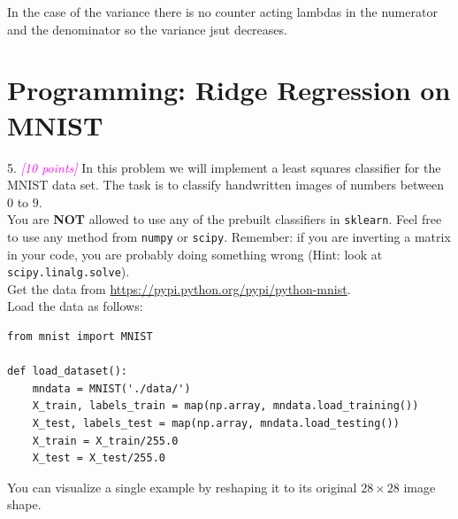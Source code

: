 \documentclass{article}
\newcommand{\1}{\mathbf{1}}
\newcommand{\grade}[1]{\small\textcolor{magenta}{\emph{[#1 points]}} \normalsize}
\begin{document}
In the case of the variance there is no counter acting lambdas in the numerator and the denominator so the variance jsut decreases. 


\section{Programming: Ridge Regression on MNIST}
5. \grade{10} In this problem we will implement a least squares classifier for the MNIST data set. The task
is to classify handwritten images of numbers between $0$ to $9$.\\

You are \textbf{NOT} allowed to use
any of the prebuilt  classifiers in \verb|sklearn|.  Feel free to use any method from \verb|numpy|
or \verb|scipy|. Remember: if you are inverting a matrix in your code, you are probably doing something wrong (Hint: look at \verb|scipy.linalg.solve|).\\

Get the data from \url{https://pypi.python.org/pypi/python-mnist}. \\
Load the data as follows:
\begin{verbatim}
from mnist import MNIST

def load_dataset():
    mndata = MNIST('./data/')
    X_train, labels_train = map(np.array, mndata.load_training())
    X_test, labels_test = map(np.array, mndata.load_testing())
    X_train = X_train/255.0
    X_test = X_test/255.0
\end{verbatim}
You can visualize a single example by reshaping it to its original $28 \times 28$ image shape.
\end{document}
